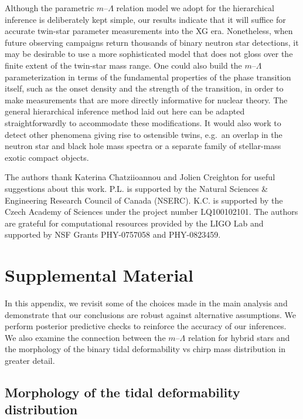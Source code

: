 \documentclass[aps,prd,twocolumn,superscriptaddress,nofootinbib]{revtex4-1}
\begin{document}
Although the parametric $m$--$\Lambda$ relation model we adopt for the hierarchical inference is deliberately kept simple, our results indicate that it will suffice for accurate twin-star parameter measurements into the XG era. Nonetheless, when future observing campaigns return thousands of binary neutron star detections, it may be desirable to use a more sophisticated model that does not gloss over the finite extent of the twin-star mass range. One could also build the $m$--$\Lambda$ parameterization in terms of the fundamental properties of the phase transition itself, such as the onset density and the strength of the transition, in order to make measurements that are more directly informative for nuclear theory. The general hierarchical inference method laid out here can be adapted straightforwardly to accommodate these modifications. It would also work to detect other phenomena giving rise to ostensible twins, e.g.~an overlap in the neutron star and black hole mass spectra or a separate family of stellar-mass exotic compact objects.

\acknowledgments

The authors thank Katerina Chatziioannou and Jolien Creighton for useful suggestions about this work.
P.L. is supported by the Natural Sciences \& Engineering Research Council of Canada (NSERC).
K.C. is supported by the Czech Academy of Sciences under the project number LQ100102101.
The authors are grateful for computational resources provided by the LIGO Lab and supported by NSF Grants PHY-0757058 and PHY-0823459.




\appendix

\section{Supplemental Material}\label{sec:supp}

In this appendix, we revisit some of the choices made in the main analysis and demonstrate that our conclusions are robust against alternative assumptions. We perform posterior predictive checks to reinforce the accuracy of our inferences. We also examine the connection between the $m$--$\Lambda$ relation for hybrid stars and the morphology of the binary tidal deformability vs chirp mass distribution in greater detail.

\subsection{Morphology of the tidal deformability distribution}
\end{document}
